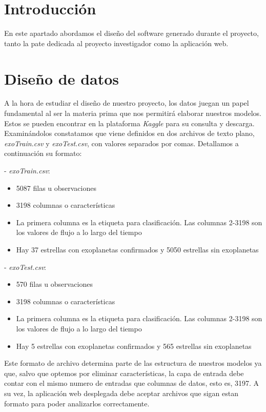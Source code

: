 
\section{Introducción}

En este apartado abordamos el diseño del software generado durante el proyecto, tanto la pate dedicada al proyecto investigador como la aplicación web.

\section{Diseño de datos}

A la hora de estudiar el diseño de nuestro proyecto, los datos juegan un papel fundamental al ser la materia prima que nos permitirá elaborar nuestros modelos. Estos se pueden encontrar en la plataforma \textit{Kaggle} para su consulta y descarga. Examinándolos constatamos que viene definidos en dos archivos de texto plano, \textit{exoTrain.csv} y \textit{exoTest.csv}, con valores separados por comas. Detallamos a continuación su formato:

- \textit{exoTrain.csv}:
\begin{itemize}
	\item 5087 filas u observaciones
	\item 3198 columnas o características
	\item La primera columna es la etiqueta para clasificación. Las columnas 2-3198 son los valores de flujo a lo largo del tiempo
	\item Hay 37 estrellas con exoplanetas confirmados y 5050 estrellas sin exoplanetas
\end{itemize}

- \textit{exoTest.csv}:
\begin{itemize}
	\item 570 filas u observaciones
	\item 3198 columnas o características
	\item La primera columna es la etiqueta para clasificación. Las columnas 2-3198 son los valores de flujo a lo largo del tiempo
	\item Hay 5 estrellas con exoplanetas confirmados y 565 estrellas sin exoplanetas
\end{itemize}

Este formato de archivo determina parte de las estructura de nuestros modelos ya que, salvo que optemos por eliminar características, la capa de entrada debe contar con el mismo numero de entradas que columnas de datos, esto es, 3197. A su vez, la aplicación web desplegada debe aceptar archivos que sigan estan formato para poder analizarlos correctamente. 

